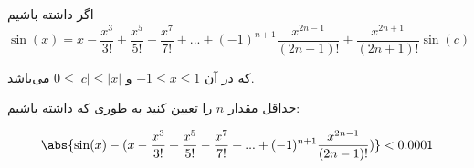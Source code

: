 اگر داشته باشیم 
$$\sin(x) = x - \frac{x^{3}}{3!} + \frac{x^{5}}{5!} - \frac{x^{7}}{7!} + . . . + (-1)^{n+1} \frac{x^{2n-1}}{(2n-1)!} + \frac{x^{2n + 1}}{(2n+1)!}\sin(c)$$

که در آن 
$-1 \leq x \leq 1$
و
$0 \leq |c| \leq |x|$
می‌باشد.

حداقل مقدار $n$ را تعیین کنید به طوری که داشته باشیم:

$$\abs{\sin(x) - (x - \frac{x^{3}}{3!} + \frac{x^{5}}{5!} - \frac{x^{7}}{7!} + . . . + (-1)^{n+1} \frac{x^{2n-1}}{(2n-1)!})} < 0.0001$$

